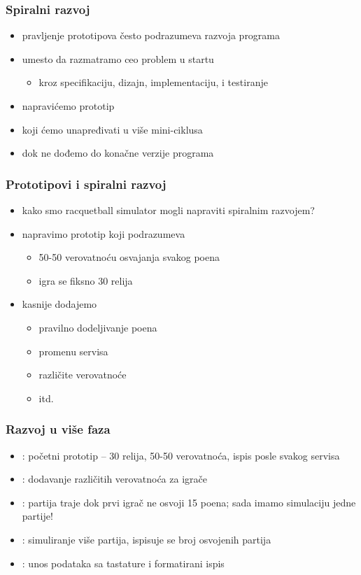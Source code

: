 \documentclass[utf8,compress,aspectratio=169]{beamer}
\begin{document}
\begin{frame}
  \frametitle{Spiralni razvoj}
\begin{itemize}
  \item pravljenje prototipova često podrazumeva  razvoja programa
  \item umesto da razmatramo ceo problem u startu
  \begin{itemize}
    \item kroz specifikaciju, dizajn, implementaciju, i testiranje
  \end{itemize}
  \item napravićemo prototip
  \item koji ćemo unapređivati u više mini-ciklusa
  \item dok ne dođemo do konačne verzije programa
\end{itemize}
\end{frame}

\begin{frame}
  \frametitle{Prototipovi i spiralni razvoj}
\begin{itemize}
  \item kako smo racquetball simulator mogli napraviti spiralnim razvojem?
  \item napravimo prototip koji podrazumeva
  \begin{itemize}
    \item 50-50 verovatnoću osvajanja svakog poena
    \item igra se fiksno 30 relija
  \end{itemize}
  \item kasnije dodajemo
  \begin{itemize}
    \item pravilno dodeljivanje poena
    \item promenu servisa
    \item različite verovatnoće
    \item itd.
  \end{itemize}
\end{itemize}
\end{frame}

\begin{frame}
  \frametitle{Razvoj u više faza}
\begin{itemize}
  \item {}: početni prototip -- 30 relija, 50-50 verovatnoća, ispis posle svakog servisa
  \item {}: dodavanje različitih verovatnoća za igrače
  \item {}: partija traje dok prvi igrač ne osvoji 15 poena; sada imamo simulaciju jedne partije!
  \item {}: simuliranje više partija, ispisuje se broj osvojenih partija
  \item {}: unos podataka sa tastature i formatirani ispis
\end{itemize}
\end{frame}
\end{document}
